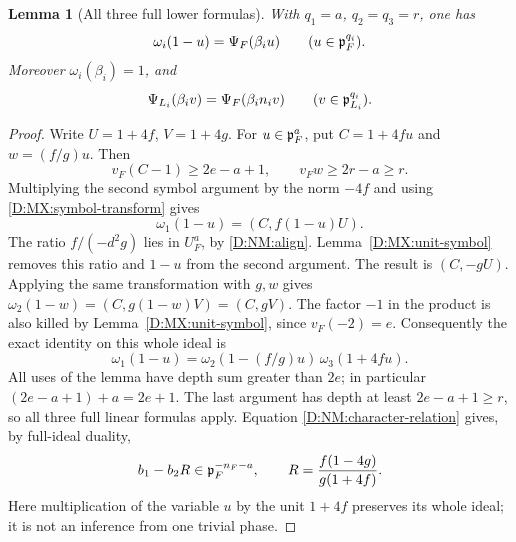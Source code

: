 \documentclass[11pt]{amsart}
\newtheorem{lemma}[theorem]{Lemma}
\theoremstyle{definition}
\theoremstyle{remark}
\begin{document}
\begin{lemma}[All three full lower formulas]\label{D:NM:lower}
With $q_1=a$, $q_2=q_3=r$, one has
\begin{equation}\label{D:NM:lowerformula}
 \omega_i(1-u)=\Psi_F(\beta_i u)\qquad(u\in\mathfrak p_F^{q_i}).
\end{equation}
Moreover $\omega_i(\beta_i)=1$, and
\begin{equation}\label{D:NM:normphase}
 \Psi_{L_i}(\beta_i v)=\Psi_F(\beta_i n_i v)
                              \qquad(v\in\mathfrak p_{L_i}^{q_i}).
\end{equation}
\end{lemma}
\begin{proof}
Write $U=1+4f$, $V=1+4g$. For $u\in\mathfrak p_F^a$, put
$C=1+4fu$ and $w=(f/g)u$. Then
\[
 v_F(C-1)\ge2e-a+1,\qquad v_Fw\ge2r-a\ge r.
\]
Multiplying the second symbol argument by the norm $-4f$ and using
\eqref{D:MX:symbol-transform} gives
\[
 \omega_1(1-u)=(C,f(1-u)U).
\]
The ratio $f/(-d^2g)$ lies in $U_F^a$, by \eqref{D:NM:align}.
Lemma~\ref{D:MX:unit-symbol} removes this ratio and $1-u$ from the second
argument. The result is $(C,-gU)$. Applying the same transformation
with $g,w$ gives
$\omega_2(1-w)=(C,g(1-w)V)=(C,gV)$.
The factor $-1$ in the product is also killed by
Lemma~\ref{D:MX:unit-symbol}, since $v_F(-2)=e$.
Consequently the exact identity on this whole ideal is
\begin{equation}\label{D:NM:character-relation}
 \omega_1(1-u)=\omega_2(1-(f/g)u)\,\omega_3(1+4fu).
\end{equation}
All uses of the lemma have depth sum greater than $2e$;
in particular $(2e-a+1)+a=2e+1$. The last argument has depth at
least $2e-a+1\ge r$, so all three full linear formulas apply.
Equation \eqref{D:NM:character-relation} gives, by full-ideal duality,
\begin{equation}\label{D:NM:ratio-covectors}
 b_1-b_2 R\in\mathfrak p_F^{-n_F-a},\qquad
 R=\frac{f(1-4g)}{g(1+4f)}.
\end{equation}
Here multiplication of the variable $u$ by the unit $1+4f$ preserves
its whole ideal; it is not an inference from one trivial phase.


\end{proof}
\end{document}
